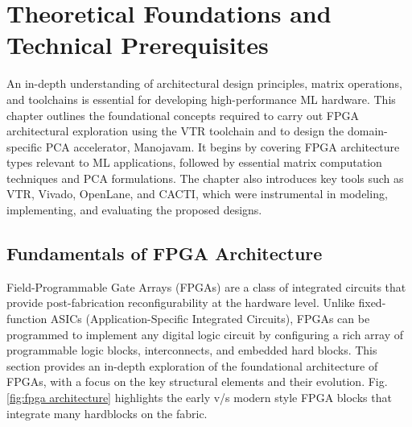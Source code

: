 \chapter{Theoretical Foundations and Technical Prerequisites}
An in-depth understanding of architectural design principles, matrix operations, and toolchains is essential for developing high-performance ML hardware. This chapter outlines the foundational concepts required to carry out FPGA architectural exploration using the VTR toolchain and to design the domain-specific PCA accelerator, Manojavam. It begins by covering FPGA architecture types relevant to ML applications, followed by essential matrix computation techniques and PCA formulations. The chapter also introduces key tools such as VTR, Vivado, OpenLane, and CACTI, which were instrumental in modeling, implementing, and evaluating the proposed designs.

\section{Fundamentals of FPGA Architecture}
Field-Programmable Gate Arrays (FPGAs) are a class of integrated circuits that provide post-fabrication reconfigurability at the hardware level. Unlike fixed-function ASICs (Application-Specific Integrated Circuits), FPGAs can be programmed to implement any digital logic circuit by configuring a rich array of programmable logic blocks, interconnects, and embedded hard blocks. This section provides an in-depth exploration of the foundational architecture of FPGAs, with a focus on the key structural elements and their evolution. Fig.\ref{fig:fpga architecture} highlights the early v/s modern style FPGA blocks that integrate many hardblocks on the fabric.

